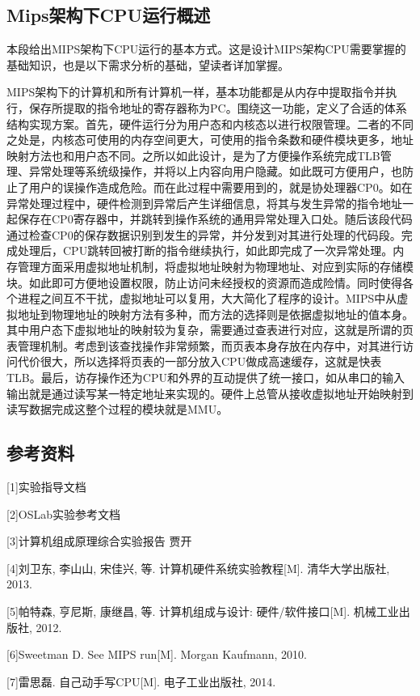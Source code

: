 \subsection{Mips架构下CPU运行概述}
本段给出MIPS架构下CPU运行的基本方式。这是设计MIPS架构CPU需要掌握的基础知识，也是以下需求分析的基础，望读者详加掌握。

MIPS架构下的计算机和所有计算机一样，基本功能都是从内存中提取指令并执行，保存所提取的指令地址的寄存器称为PC。围绕这一功能，定义了合适的体系结构实现方案。首先，硬件运行分为用户态和内核态以进行权限管理。二者的不同之处是，内核态可使用的内存空间更大，可使用的指令条数和硬件模块更多，地址映射方法也和用户态不同。之所以如此设计，是为了方便操作系统完成TLB管理、异常处理等系统级操作，并将以上内容向用户隐藏。如此既可方便用户，也防止了用户的误操作造成危险。而在此过程中需要用到的，就是协处理器CP0。如在异常处理过程中，硬件检测到异常后产生详细信息，将其与发生异常的指令地址一起保存在CP0寄存器中，并跳转到操作系统的通用异常处理入口处。随后该段代码通过检查CP0的保存数据识别到发生的异常，并分发到对其进行处理的代码段。完成处理后，CPU跳转回被打断的指令继续执行，如此即完成了一次异常处理。内存管理方面采用虚拟地址机制，将虚拟地址映射为物理地址、对应到实际的存储模块。如此即可方便地设置权限，防止访问未经授权的资源而造成险情。同时使得各个进程之间互不干扰，虚拟地址可以复用，大大简化了程序的设计。MIPS中从虚拟地址到物理地址的映射方法有多种，而方法的选择则是依据虚拟地址的值本身。其中用户态下虚拟地址的映射较为复杂，需要通过查表进行对应，这就是所谓的页表管理机制。考虑到该查找操作非常频繁，而页表本身存放在内存中，对其进行访问代价很大，所以选择将页表的一部分放入CPU做成高速缓存，这就是快表TLB。最后，访存操作还为CPU和外界的互动提供了统一接口，如从串口的输入输出就是通过读写某一特定地址来实现的。硬件上总管从接收虚拟地址开始映射到读写数据完成这整个过程的模块就是MMU。

\subsection{参考资料}
[1]实验指导文档

[2]OSLab实验参考文档
	
[3]计算机组成原理综合实验报告 贾开

[4]刘卫东, 李山山, 宋佳兴, 等. 计算机硬件系统实验教程[M]. 清华大学出版社, 2013.
	
[5]帕特森, 亨尼斯, 康继昌, 等. 计算机组成与设计: 硬件/软件接口[M]. 机械工业出版社, 2012.
	
[6]Sweetman D. See MIPS run[M]. Morgan Kaufmann, 2010.

[7]雷思磊. 自己动手写CPU[M]. 电子工业出版社, 2014.
